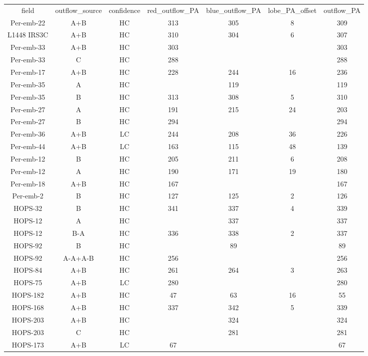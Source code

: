 \begin{deluxetable}
\begin{tabular}{ccccccc}
field & outflow_source & confidence & red_outflow_PA & blue_outflow_PA & lobe_PA_offset & outflow_PA \\
Per-emb-22 & A+B & HC & 313 & 305 & 8 & 309 \\
L1448 IRS3C & A+B & HC & 310 & 304 & 6 & 307 \\
Per-emb-33 & A+B & HC & 303 & \nodata & \nodata & 303 \\
Per-emb-33 & C & HC & 288 & \nodata & \nodata & 288 \\
Per-emb-17 & A+B & HC & 228 & 244 & 16 & 236 \\
Per-emb-35 & A & HC & \nodata & 119 & \nodata & 119 \\
Per-emb-35 & B & HC & 313 & 308 & 5 & 310 \\
Per-emb-27 & A & HC & 191 & 215 & 24 & 203 \\
Per-emb-27 & B & HC & 294 & \nodata & \nodata & 294 \\
Per-emb-36 & A+B & LC & 244 & 208 & 36 & 226 \\
Per-emb-44 & A+B & LC & 163 & 115 & 48 & 139 \\
Per-emb-12 & B & HC & 205 & 211 & 6 & 208 \\
Per-emb-12 & A & HC & 190 & 171 & 19 & 180 \\
Per-emb-18 & A+B & HC & 167 & \nodata & \nodata & 167 \\
Per-emb-2 & B & HC & 127 & 125 & 2 & 126 \\
HOPS-32 & B & HC & 341 & 337 & 4 & 339 \\
HOPS-12 & A & HC & \nodata & 337 & \nodata & 337 \\
HOPS-12 & B-A & HC & 336 & 338 & 2 & 337 \\
HOPS-92 & B & HC & \nodata & 89 & \nodata & 89 \\
HOPS-92 & A-A+A-B & HC & 256 & \nodata & \nodata & 256 \\
HOPS-84 & A+B & HC & 261 & 264 & 3 & 263 \\
HOPS-75 & A+B & LC & 280 & \nodata & \nodata & 280 \\
HOPS-182 & A+B & HC & 47 & 63 & 16 & 55 \\
HOPS-168 & A+B & HC & 337 & 342 & 5 & 339 \\
HOPS-203 & A+B & HC & \nodata & 324 & \nodata & 324 \\
HOPS-203 & C & HC & \nodata & 281 & \nodata & 281 \\
HOPS-173 & A+B & LC & 67 & \nodata & \nodata & 67 \\

\end{tabular}
\end{deluxetable}
